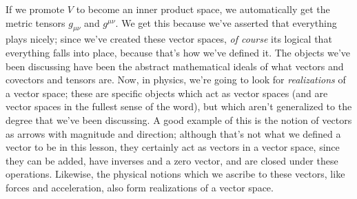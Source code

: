 If we promote $V$ to become an inner product space, we automatically get the metric tensors $g_{\mu\nu}$ and $g^{\mu\nu}$.
We get this because we've asserted that everything plays nicely; since we've created these vector spaces, \emph{of course} its logical that everything falls into place, because that's how we've defined it.
The objects we've been discussing have been the abstract mathematical ideals of what vectors and covectors and tensors are.
Now, in physics, we're going to look for \emph{realizations} of a vector space; these are specific objects which act as vector spaces (and are vector spaces in the fullest sense of the word), but which aren't generalized to the degree that we've been discussing.
A good example of this is the notion of vectors as arrows with magnitude and direction; although that's not what we defined a vector to be in this lesson, they certainly act as vectors in a vector space, since they can be added, have inverses and a zero vector, and are closed under these operations.
Likewise, the physical notions which we ascribe to these vectors, like forces and acceleration, also form realizations of a vector space.

